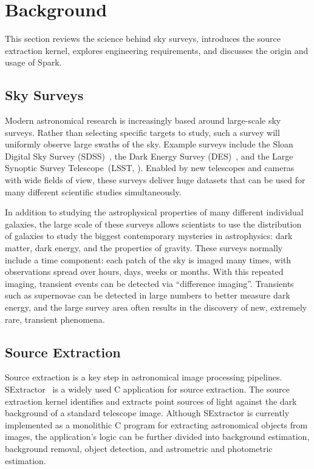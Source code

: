 \documentclass[10pt,journal,compsoc]{IEEEtran}
\begin{document}
\section{Background}
\label{sec:Background}

This section reviews the science behind sky surveys, introduces the source extraction kernel, explores engineering requirements, and discusses the origin and usage of Spark.

\subsection{Sky Surveys}

Modern astronomical research is increasingly based around large-scale sky surveys.
Rather than selecting specific targets to study, such a survey will uniformly observe large
swaths of the sky. Example surveys include the Sloan Digital Sky Survey (SDSS)~\cite{york00},
the Dark Energy Survey (DES)~\cite{dark05}, and the Large Synoptic Survey Telescope~(LSST,
\cite{ivezic08}). Enabled by new telescopes and cameras with wide fields of view, these
surveys deliver huge datasets that can be used for many different scientific studies
simultaneously.

In addition to studying the astrophysical properties of many different individual galaxies,
the large scale of these surveys allows scientists to use the distribution of galaxies to
study the biggest contemporary mysteries in astrophysics: dark matter, dark energy, and 
the properties of gravity. These surveys normally include a time component: each patch of the sky is imaged many times,
with observations spread over hours, days, weeks or months. With this repeated imaging,
transient events can be detected via ``difference imaging''. Transients such as supernovae
can be detected in large numbers to better measure dark energy, and the large survey area
often results in the discovery of new, extremely rare, transient phenomena.

\subsection{Source Extraction}
\label{sec:Background-SE}
Source extraction is a key step in astronomical image processing pipelines.
SExtractor~\cite{bertin96} is a widely used C application for source extraction. The source
extraction kernel identifies and extracts point sources of light against the dark background of
a standard telescope image.
Although SExtractor is currently implemented as a monolithic C program for extracting astronomical
objects from images, the application's logic can be further divided into 
background estimation, background removal, object detection, and astrometric 
and photometric estimation.
\end{document}
